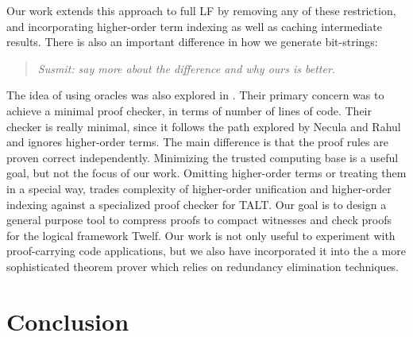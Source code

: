 \documentclass{acmconf}
\newenvironment{note}{\begin{quote}\message{note!}\it}{\end{quote}}
\begin{document}
Our work extends this approach to full LF by removing any of
these restriction, and incorporating higher-order term indexing as
well as caching intermediate results. There is also an important
difference in how we generate bit-strings:

\begin{note}
  Susmit: say more about the difference and why ours is better.
\end{note}


The idea of using oracles was also explored in
\cite{wu+:foundationalproofcheck}. Their primary concern was to 
achieve a minimal proof checker, in terms of number of lines of
code. Their checker is really minimal, since it follows the path
explored by Necula and Rahul and ignores higher-order
terms. The main difference is that the proof rules are proven correct
independently. Minimizing the trusted computing base is a useful
goal, but not the focus of our work. Omitting higher-order terms or
treating them in a special way, trades complexity of higher-order
unification and higher-order indexing against a specialized proof
checker for TALT. Our goal is to design a general purpose tool to
compress proofs to compact witnesses and check proofs for the logical
framework Twelf. Our work is not only useful to experiment with
proof-carrying code applications, but we also have incorporated it
into the a more sophisticated theorem prover which relies on 
redundancy elimination techniques. 


\section{Conclusion}




\end{document}
